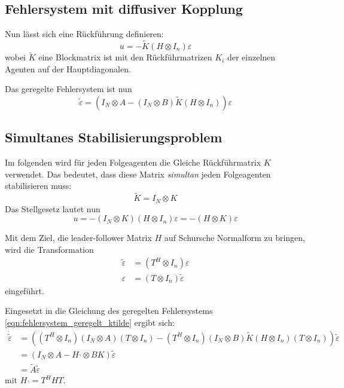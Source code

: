 \subsection{Fehlersystem mit diffusiver Kopplung}
Nun lässt sich eine Rückführung definieren:
\begin{equation}
    u=-\tilde{K}(H\otimes I_n)\varepsilon
\end{equation}
wobei $\tilde{K}$ eine Blockmatrix ist mit den Rückführmatrizen $K_i$ der einzelnen
Agenten auf der Hauptdiagonalen.

Das geregelte Fehlersystem ist nun
\begin{equation}
    \dot{\varepsilon} = (I_N \otimes A - (I_N \otimes B) \tilde{K}(H \otimes I_n))\varepsilon
    \label{eqn:fehlersystem_geregelt_ktilde}
\end{equation}

\subsection{Simultanes Stabilisierungsproblem}
Im folgenden wird für jeden Folgeagenten die Gleiche Rückführmatrix $K$ verwendet.
Das bedeutet, dass diese Matrix \emph{simultan} jeden Folgeagenten stabilisieren
muss:
\begin{equation}
    \tilde{K}=I_N \otimes K
\end{equation}
Das Stellgesetz lautet nun
\begin{equation}
    u=-(I_N \otimes K) (H \otimes I_n)\varepsilon = -(H \otimes K)\varepsilon
\end{equation}

Mit dem Ziel, die leader-follower Matrix $H$ auf Schursche Normalform zu bringen,
wird die Transformation
\begin{align}
    \tilde{\varepsilon} &= (T^H \otimes I_n)\varepsilon \\
    \varepsilon &= (T \otimes I_n)\tilde{\varepsilon}
\end{align}
eingeführt.

Eingesetzt in die Gleichung des geregelten Fehlersystems \ref{eqn:fehlersystem_geregelt_ktilde}
ergibt sich:
\begin{align}
    \dot{\tilde{\varepsilon}} &=((T^H \otimes I_n)(I_N \otimes A)(T \otimes I_n) - (T^H \otimes I_n)(I_N \otimes B)\tilde{K}(H \otimes I_n)(T \otimes I_n)) \tilde{\varepsilon} \\
    &= (I_N \otimes A - H_\urcorner \otimes BK)\tilde{\varepsilon} \\
    &= \tilde{A}\tilde{\varepsilon} 
\end{align}
mit $H_\urcorner = T^H H T$.

